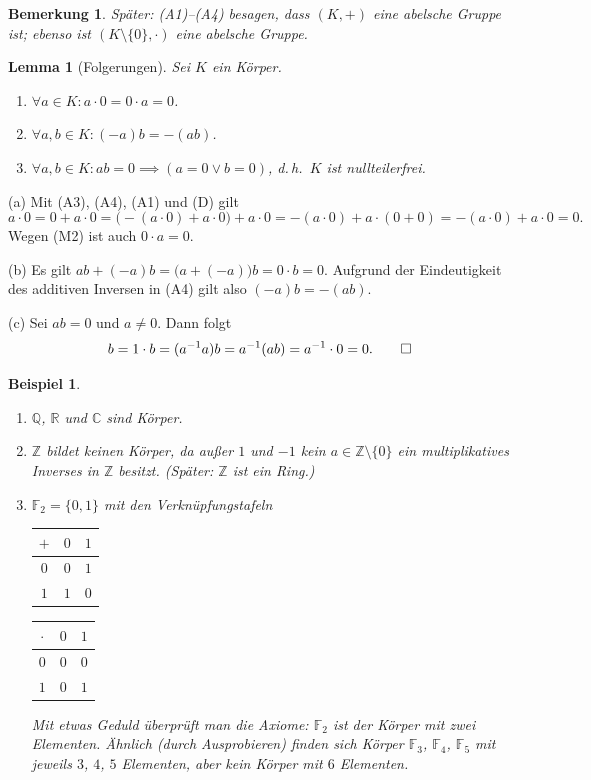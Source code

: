 \documentclass[a4paper]{article}
\makeatletter
\theoremstyle{kurzskript}
\newtheorem{lemma}[satz]{Lemma}
\newtheorem{beispiel}[satz]{Beispiel}
\newtheorem*{bem}{Bemerkung}
\renewenvironment{proof}[1][\proofname]{\par\pushQED{\qed}%
  \normalfont\topsep\medskipamount\relax
  \trivlist\item[\hskip\labelsep\bfseries #1\@addpunct{.}]\ignorespaces}%
  {\popQED\endtrivlist\@endpefalse}
\renewcommand{\proofname}{Beweis}
\newcommand{\Z}{\mathbb{Z}}
\newcommand{\Q}{\mathbb{Q}}
\newcommand{\R}{\mathbb{R}}
\makeatother
\begin{document}
\begin{bem}
Später: (A1)--(A4) besagen, dass $(K, +)$ eine \emph{abelsche Gruppe} ist; ebenso ist $(K \setminus \{0\}, \cdot)$ eine abelsche Gruppe.
\end{bem}

\begin{lemma}[Folgerungen]
Sei $K$ ein Körper.
\begin{enumerate}[label=(\alph*)]
  \item $\forall a \in K\colon a \cdot 0 = 0 \cdot a = 0$.
  \item $\forall a, b \in K\colon (-a)b = -(ab)$.
  \item $\forall a, b \in K\colon ab = 0 \implies (a = 0 \lor b = 0)$, d.\,h.\ $K$ ist \emph{nullteilerfrei}.
\end{enumerate}
\end{lemma}

\begin{proof}
(a) Mit (A3), (A4), (A1) und (D) gilt
\[
  a \cdot 0 = 0 + a \cdot 0 = \bigl(-(a \cdot 0) + a \cdot 0\bigr) + a \cdot 0 = -(a \cdot 0) + a \cdot (0 + 0) = -(a \cdot 0) + a \cdot 0 = 0.
\]
Wegen (M2) ist auch $0 \cdot a = 0$.

(b) Es gilt $ab + (-a)b = \bigl(a + (-a)\bigr)b = 0 \cdot b = 0$. Aufgrund der Eindeutigkeit des additiven Inversen in (A4) gilt also $(-a)b = -(ab)$.

(c) Sei $ab = 0$ und $a \neq 0$. Dann folgt
\[
  b = 1 \cdot b = (a^{-1}a)b = a^{-1}(ab) = a^{-1} \cdot 0 = 0. \qedhere
\]
\end{proof}

\begin{beispiel}
\leavevmode
\begin{enumerate}[label=(\alph*)]
  \item $\Q$, $\R$ und $\mathbb{C}$ sind Körper.
  \item $\Z$ bildet \emph{keinen} Körper, da außer $1$ und $-1$ kein $a \in \Z \setminus \{0\}$ ein multiplikatives Inverses in $\Z$ besitzt. (Später: $\Z$ ist ein \emph{Ring}.)
  \item $\mathbb{F}_2 = \{0, 1\}$ mit den Verknüpfungstafeln
  \begin{center}
  \begin{tabular}{c|cc}
    $+$ & $0$ & $1$\\\hline
    $0$ & $0$ & $1$\\
    $1$ & $1$ & $0$
  \end{tabular}
  \qquad\qquad
  \begin{tabular}{c|cc}
    $\cdot$ & $0$ & $1$\\\hline
    $0$ & $0$ & $0$\\
    $1$ & $0$ & $1$
  \end{tabular}
  \end{center}
  Mit etwas Geduld überprüft man die Axiome: $\mathbb{F}_2$ ist \emph{der} Körper mit zwei Elementen. Ähnlich (durch Ausprobieren) finden sich Körper $\mathbb{F}_3$, $\mathbb{F}_4$, $\mathbb{F}_5$ mit jeweils $3$, $4$, $5$ Elementen, aber \emph{kein} Körper mit $6$ Elementen.
\end{enumerate}
\end{beispiel}
\end{document}

